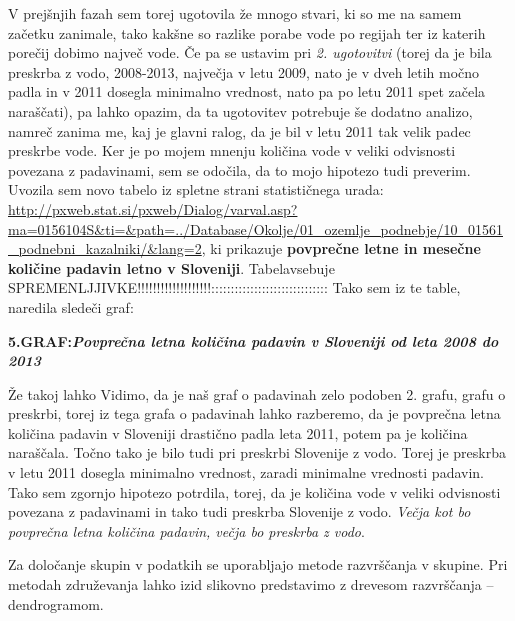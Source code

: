 \documentclass[11pt,a4paper]{article}
\begin{document}
V prejšnjih fazah sem torej ugotovila že mnogo stvari, ki so me na samem začetku zanimale, tako kakšne so razlike porabe vode po regijah ter iz katerih porečij dobimo največ vode. Če pa se ustavim pri \emph{2. ugotovitvi} (torej da je bila preskrba z vodo, 2008-2013, največja v letu 2009, nato je v dveh letih močno padla in v 2011 dosegla minimalno vrednost, nato pa po letu 2011 spet začela naraščati), pa lahko opazim, da ta ugotovitev potrebuje še dodatno analizo, namreč zanima me, kaj je glavni ralog, da je bil v letu 2011 tak velik padec preskrbe vode. Ker je po mojem mnenju količina vode v veliki odvisnosti povezana z padavinami, sem se odočila, da to mojo hipotezo tudi preverim. Uvozila sem novo tabelo iz spletne strani statističnega urada: \url{http://pxweb.stat.si/pxweb/Dialog/varval.asp?ma=0156104S&ti=&path=../Database/Okolje/01_ozemlje_podnebje/10_01561_podnebni_kazalniki/&lang=2}, ki prikazuje \textbf{povprečne letne in mesečne količine padavin letno v Sloveniji}. Tabelavsebuje SPREMENLJJIVKE!!!!!!!!!!!!!!!!!!!:::::::::::::::::::::::::::::: Tako sem iz te table, naredila sledeči graf:
\newpage

\textbf{5.GRAF:\emph{Povprečna letna količina padavin v Sloveniji od leta 2008 do 2013}}


Že takoj lahko Vidimo, da je naš graf o padavinah zelo podoben 2. grafu, grafu o preskrbi, torej iz tega grafa o padavinah lahko razberemo, da je povprečna letna količina padavin v Sloveniji drastično padla leta 2011, potem pa je količina naraščala. Točno tako je bilo tudi pri preskrbi Slovenije z vodo. Torej je preskrba v letu 2011 dosegla minimalno vrednost, zaradi minimalne vrednosti padavin.  Tako sem zgornjo hipotezo potrdila, torej, da je količina vode v veliki odvisnosti povezana z padavinami in tako tudi preskrba Slovenije z vodo. \emph{Večja kot bo povprečna letna količina padavin, večja bo preskrba z vodo}.

\newpage







Za določanje skupin v podatkih se uporabljajo metode
razvrščanja v skupine. Pri metodah združevanja lahko izid
slikovno predstavimo z drevesom razvrščanja – dendrogramom.


% 
% 
% 
% 
\end{document}
